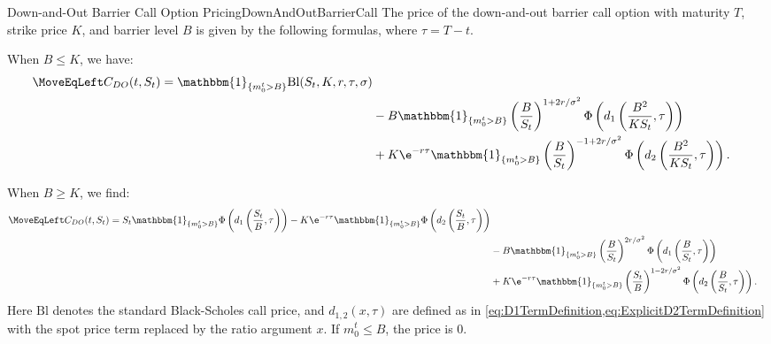 \begin{prop}{Down-and-Out Barrier Call Option Pricing}{DownAndOutBarrierCall}
    The price of the down-and-out barrier call option with maturity $T$, strike price $K$, and barrier level $B$ is given by the following formulas, where $\tau = T-t$.

    When $B \le K$, we have:
    \begin{align}
        \MoveEqLeft C_{DO}(t, S_t) = \mathbbm{1}_{\{m_0^t > B\}} \mathrm{Bl}(S_t, K, r, \tau, \sigma) \nonumber \\
        &- B \mathbbm{1}_{\{m_0^t > B\}} \left( \frac{B}{S_t} \right)^{1+2r/\sigma^2} \Phi \left( d_1 \left( \frac{B^2}{K S_t}, \tau \right) \right) \nonumber \\
        &+ K \e^{-r\tau} \mathbbm{1}_{\{m_0^t > B\}} \left( \frac{B}{S_t} \right)^{-1+2r/\sigma^2} \Phi \left( d_2 \left( \frac{B^2}{K S_t}, \tau \right) \right).
    \end{align}

    When $B \ge K$, we find:
    \begin{align}
        \MoveEqLeft C_{DO}(t, S_t) = S_t \mathbbm{1}_{\{m_0^t > B\}} \Phi \left( d_1 \left( \frac{S_t}{B}, \tau \right) \right) - K \e^{-r\tau} \mathbbm{1}_{\{m_0^t > B\}} \Phi \left( d_2 \left( \frac{S_t}{B}, \tau \right) \right) \nonumber \\
        &- B \mathbbm{1}_{\{m_0^t > B\}} \left( \frac{B}{S_t} \right)^{2r/\sigma^2} \Phi \left( d_1 \left( \frac{B}{S_t}, \tau \right) \right) \nonumber \\
        &+ K \e^{-r\tau} \mathbbm{1}_{\{m_0^t > B\}} \left( \frac{S_t}{B} \right)^{1-2r/\sigma^2} \Phi \left( d_2 \left( \frac{B}{S_t}, \tau \right) \right).
    \end{align}
    Here $\mathrm{Bl}$ denotes the standard Black-Scholes call price, and $d_{1,2}(x, \tau)$ are defined as in \cref{eq:D1TermDefinition,eq:ExplicitD2TermDefinition} with the spot price term replaced by the ratio argument $x$. If $m_0^t \le B$, the price is $0$.
\end{prop}


